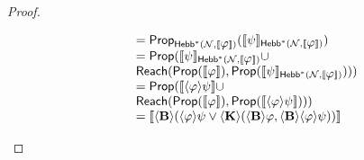 \documentclass[letterpaper]{article}
\theoremstyle{definition}
\newcommand{\semantics}[1]{[\![\mbox{\em $ #1 $\/}]\!]}
\newcommand{\Net}{\mathcal{N}}
\newcommand{\Prop}{\textsf{Prop}}
\newcommand{\Reach}{\textsf{Reach}}
\newcommand{\Hebbstar}[2]{\textsf{Hebb}^*(#1, #2)}
\newcommand{\diaBelieve}[1]{\langle \textrm{\textup{\textbf{B}}} \rangle #1}
\newcommand{\diaKnow}[2]{\langle \textrm{\textup{\textbf{K}}} \rangle(#1, #2)}
\newcommand{\diaHebbop}[1]{\langle #1\rangle}
\begin{document}
\begin{proof}
\begin{description}
\[\begin{array}{l}
            \quad \quad = \Prop_{\Hebbstar{\Net}{\semantics{\varphi}}}(\semantics{\psi}_{\Hebbstar{\Net}{\semantics{\varphi}}}) \\

            \quad \quad = \Prop(
                \semantics{\psi}_{\Hebbstar{\Net}{\semantics{\varphi}}} \cup \\
            \quad \quad
                \Reach(
                    \Prop(\semantics{\varphi}),
                    \Prop(\semantics{\psi}_{\Hebbstar{\Net}{\semantics{\varphi}}})
                )
            )\\
            
            \quad \quad = \Prop(
                \semantics{\diaHebbop{\varphi} \psi} \cup \\
            \quad \quad
                \Reach(
                    \Prop(\semantics{\varphi}),
                    \Prop(\semantics{\diaHebbop{\varphi} \psi})
                )
            )\\

            \quad \quad = \semantics{\diaBelieve{(\diaHebbop{\varphi} \psi \lor \diaKnow{\diaBelieve{\varphi}}{\diaBelieve{\diaHebbop{\varphi} \psi})}}}
        \end{array}
        \]
        
    \end{description}
\end{proof}
\end{document}
